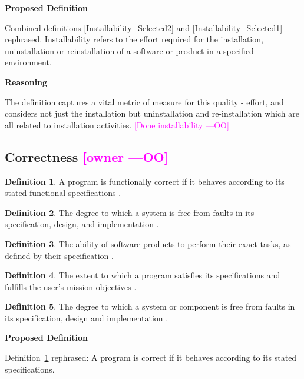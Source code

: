 \documentclass[letterpaper,cleveref]{lipics-v2019}
\newcommand{\authornote}[3]{\textcolor{#1}{[#3 ---#2]}}
\newcommand{\authornote}[3]{}
\newcommand{\oo}[1]{\authornote{magenta}{OO}{#1}} %
\theoremstyle{definition}
\newtheorem{defn}{Definition}
\begin{document}
\noindent \textbf{Proposed Definition}

Combined definitions \ref{Installability_Selected2} and
\ref{Installability_Selected1} rephrased.  Installability refers to the
effort required for the installation, uninstallation or reinstallation of a
software or product in a specified environment.

\noindent \textbf{Reasoning}

 The definition captures a vital metric of measure for this quality - effort, and considers not just the installation but uninstallation and re-installation which are all related to installation activities.  \oo{Done installability}

\subsection{{Correctness} \oo{owner}}

\begin{defn} \label{Correctness_Selected}
  A program is functionally correct if it behaves according to its stated
  functional specifications \citep{GhezziEtAl2003}.  	
\end{defn}

\begin{defn}
  The degree to which a system is free from faults in its specification, design, and 
  implementation \citep{mcconnell2004code}.
\end{defn}

\begin{defn}
  The ability of software products to perform their exact tasks, as defined by
  their specification \citep{meyer1988object}.
\end{defn}

\begin{defn} 
  The extent to which a program satisfies its specifications and fulfills the
  user's mission objectives \citep{McCallEtAl1977}. 
\end{defn}

\begin{defn}  
  The degree to which a system or component is free from faults in its
  specification, design and implementation \citep{IEEEComputerDictionary1991}.
\end{defn}

\noindent \textbf{Proposed Definition}

Definition~\ref{Correctness_Selected} rephrased: A program is correct if it
behaves according to its stated specifications.
\end{document}
